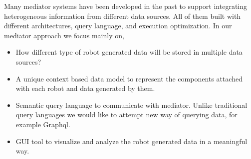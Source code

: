 	
	Many mediator systems have been developed in the past to support integrating heterogeneous information from different data sources. All of them built with different architectures, query language, and execution optimization. In our mediator approach we focus mainly on,
	\begin{itemize}
		\item How different type of robot generated data will be stored in multiple data sources?
		\item A unique context based data model to represent the components attached with each robot and data generated by them.
		\item Semantic query language to communicate with mediator. Unlike traditional query languages we would like to attempt new way of querying data, for example Graphql.
		\item GUI tool to visualize and analyze the robot generated data in a meaningful way.
	\end{itemize} 


